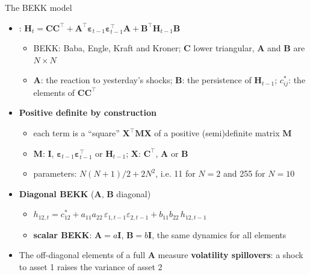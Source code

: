 \begin{frame}{The BEKK model}
\itemsize{\footnotesize}
\begin{itemize}
    \item {}: $\mathbf{H}_t = \mathbf{C}\mathbf{C}^\top + \mathbf{A}^\top\boldsymbol{\varepsilon}_{t-1}\boldsymbol{\varepsilon}_{t-1}^\top\mathbf{A} + \mathbf{B}^\top\mathbf{H}_{t-1}\mathbf{B}$
    \begin{itemize}
        \item BEKK: Baba, Engle, Kraft and Kroner; $\mathbf{C}$ lower triangular, $\mathbf{A}$ and $\mathbf{B}$ are $N \times N$
        \item $\mathbf{A}$: the reaction to yesterday's shocks; $\mathbf{B}$: the persistence of $\mathbf{H}_{t-1}$; $c_{ij}^*$: the elements of $\mathbf{C}\mathbf{C}^\top$
    \end{itemize}
    \item \textbf{Positive definite by construction}
    \begin{itemize}
        \item each term is a ``square'' $\mathbf{X}^\top\mathbf{M}\mathbf{X}$ of a positive (semi)definite matrix $\mathbf{M}$
        \item $\mathbf{M}$: $\mathbf{I}$, $\boldsymbol{\varepsilon}_{t-1}\boldsymbol{\varepsilon}_{t-1}^\top$ or $\mathbf{H}_{t-1}$; $\mathbf{X}$: $\mathbf{C}^\top$, $\mathbf{A}$ or $\mathbf{B}$
        \item parameters: $N(N+1)/2 + 2N^2$, i.e. 11 for $N = 2$ and 255 for $N = 10$
    \end{itemize}
    \item \textbf{Diagonal BEKK} ($\mathbf{A}$, $\mathbf{B}$ diagonal)
    \begin{itemize}
        \item $h_{12,t} = c_{12}^* + a_{11}a_{22}\,\varepsilon_{1,t-1}\varepsilon_{2,t-1} + b_{11}b_{22}\,h_{12,t-1}$
        \item \textbf{scalar BEKK}: $\mathbf{A} = a\mathbf{I}$, $\mathbf{B} = b\mathbf{I}$, the same dynamics for all elements
    \end{itemize}
    \item The off-diagonal elements of a full $\mathbf{A}$ measure \textbf{volatility spillovers}: a shock to asset 1 raises the variance of asset 2
\end{itemize}
\end{frame}

